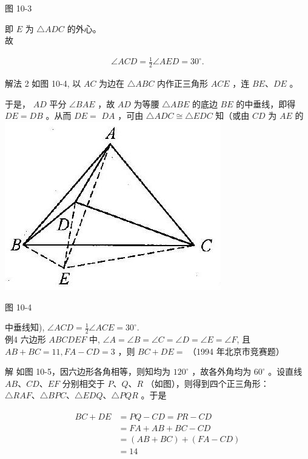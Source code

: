 \documentclass[10pt]{article}
\begin{document}
图 10-3

即 $E$ 为 $\triangle A D C$ 的外心。\\
故

\begin{align*}
\angle A C D=\frac{1}{2} \angle A E D=30^{\circ} .
\end{align*}

解法 2 如图 10-4, 以 $A C$ 为边在 $\triangle A B C$ 内作正三角形 $A C E$ ，连 $B E 、 D E$ 。

于是， $A D$ 平分 $\angle B A E$ ，故 $A D$ 为等腰 $\triangle A B E$ 的底边 $B E$ 的中垂线，即得 $D E=D B$ 。从而 $D E=$ $D A$ ，可由 $\triangle A D C \cong \triangle E D C$ 知（或由 $C D$ 为 $A E$ 的\\
\includegraphics[max width=\textwidth, center]{2024_10_30_2c8f45efd4a519b08e1ag-096}

图 10-4

中垂线知), $\angle A C D=\frac{1}{2} \angle A C E=30^{\circ}$.\\
例4 六边形 $A B C D E F$ 中, $\angle A=\angle B=\angle C=\angle D=\angle E=\angle F$, 且 $A B+B C=11, F A-C D=3$ ，则 $B C+D E=$ （1994 年北京市竞赛题）

解 如图 10-5，因六边形各角相等，则知均为 $120^{\circ}$ ，故各外角均为 $60^{\circ}$ 。设直线 $A B 、 C D 、 E F$ 分别相交于 $P 、 Q 、 R$ （如图），则得到四个正三角形： $\triangle R A F 、 \triangle B P C 、 \triangle E D Q 、 \triangle P Q R$ 。于是

\begin{align*}
\begin{aligned}
B C+D E & =P Q-C D=P R-C D \\
& =F A+A B+B C-C D \\
& =(A B+B C)+(F A-C D) \\
& =14
\end{aligned}
\end{align*}
\end{document}
